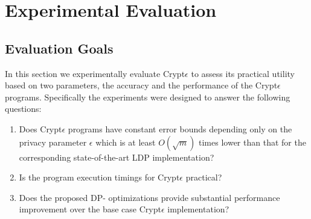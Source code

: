 \section{Experimental Evaluation}
\subsection{Evaluation Goals}
In this section we experimentally evaluate  Crypt$\epsilon$ to assess its practical utility  based on two parameters, the accuracy and the performance of the Crypt$\epsilon$ programs. Specifically the experiments were designed to answer the following questions:
\begin{enumerate}\item Does Crypt$\epsilon$ programs have constant error bounds depending only on the privacy parameter $\epsilon$  which is at least $O(\sqrt{m})$ times lower than that for the corresponding state-of-the-art LDP implementation? \item Is the program execution timings for Crypt$\epsilon$ practical? \item Does the proposed DP- optimizations provide substantial performance improvement over the base case Crypt$\epsilon$ implementation? \end{enumerate}

